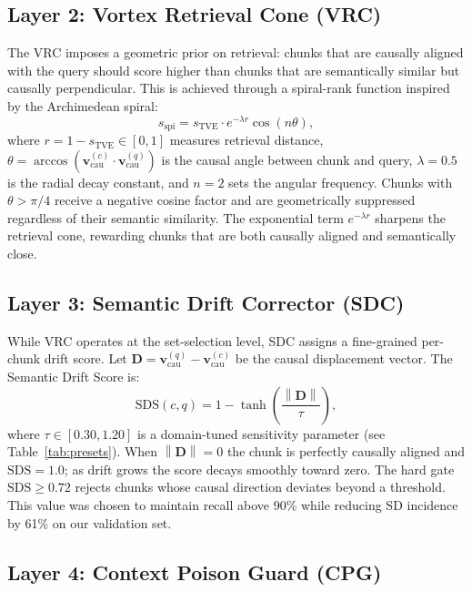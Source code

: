 \documentclass[10pt,twocolumn]{article}
\newcommand{\norm}[1]{\left\|#1\right\|}
\begin{document}
\subsection{Layer 2: Vortex Retrieval Cone (VRC)}\label{ssec:vrc}

The VRC imposes a geometric prior on retrieval: chunks that are causally
aligned with the query should score higher than chunks that are semantically
similar but causally perpendicular.  This is achieved through a spiral-rank
function inspired by the Archimedean spiral:
\begin{equation}\label{eq:vrc}
  s_\text{spi} = s_\text{TVE}\cdot e^{-\lambda r}\cos(n\theta),
\end{equation}
where $r = 1 - s_\text{TVE} \in [0,1]$ measures retrieval distance, $\theta =
\arccos(\mathbf{v}_\text{cau}^{(c)} \cdot \mathbf{v}_\text{cau}^{(q)})$ is the
causal angle between chunk and query, $\lambda = 0.5$ is the radial decay
constant, and $n=2$ sets the angular frequency.  Chunks with $\theta > \pi/4$
receive a negative cosine factor and are geometrically suppressed regardless
of their semantic similarity.  The exponential term $e^{-\lambda r}$ sharpens
the retrieval cone, rewarding chunks that are both causally aligned and
semantically close.

\subsection{Layer 3: Semantic Drift Corrector (SDC)}\label{ssec:sdc}

While VRC operates at the set-selection level, SDC assigns a fine-grained
per-chunk drift score.  Let $\mathbf{D} = \mathbf{v}_\text{cau}^{(q)} -
\mathbf{v}_\text{cau}^{(c)}$ be the causal displacement vector.  The
Semantic Drift Score is:
\begin{equation}\label{eq:sds}
  \text{SDS}(c,q) = 1 - \tanh\!\left(\frac{\norm{\mathbf{D}}}{\tau}\right),
\end{equation}
where $\tau \in [0.30, 1.20]$ is a domain-tuned sensitivity parameter (see
Table~\ref{tab:presets}).  When $\norm{\mathbf{D}} = 0$ the chunk is perfectly
causally aligned and $\text{SDS} = 1.0$; as drift grows the score decays
smoothly toward zero.  The hard gate $\text{SDS} \geq 0.72$ rejects chunks
whose causal direction deviates beyond a threshold.  This value was chosen to
maintain recall above 90\% while reducing SD incidence by 61\% on our validation
set.

\subsection{Layer 4: Context Poison Guard (CPG)}\label{ssec:cpg}
\end{document}
